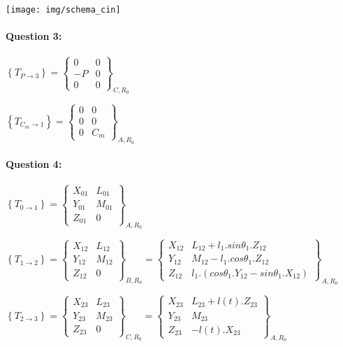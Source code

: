 \begin{center}
 \texttt{[image: img/schema\_cin]}
\end{center}

\paragraph{Question 3:}

$\left\{T_{P\rightarrow 3}\right\}=\left\{\begin{array}{cc}
0 & 0 \\
-P & 0 \\
0 & 0
\end{array}\right\}_{C,R_0}$

$\left\{T_{C_m\rightarrow 1}\right\}=\left\{\begin{array}{cc}
0 & 0 \\
0 & 0 \\
0 & C_m
\end{array}\right\}_{A,R_0}$

\paragraph{Question 4:}

$\left\{T_{0\rightarrow 1}\right\}=\left\{\begin{array}{cc}
X_{01} & L_{01} \\
Y_{01} & M_{01} \\
Z_{01} & 0
\end{array}\right\}_{A,R_0}$

$\left\{T_{1\rightarrow 2}\right\}=\left\{\begin{array}{cc}
X_{12} & L_{12} \\
Y_{12} & M_{12} \\
Z_{12} & 0
\end{array}\right\}_{B,R_0}=\left\{\begin{array}{cc}
X_{12} & L_{12}+l_1.sin\theta_1.Z_{12} \\
Y_{12} & M_{12}-l_1.cos\theta_1.Z_{12} \\
Z_{12} & l_1.(cos\theta_1.Y_{12}-sin\theta_1.X_{12})
\end{array}\right\}_{A,R_0}$

$\left\{T_{2\rightarrow 3}\right\}=\left\{\begin{array}{cc}
X_{23} & L_{23} \\
Y_{23} & M_{23} \\
Z_{23} & 0
\end{array}\right\}_{C,R_0}=\left\{\begin{array}{cc}
X_{23} & L_{23}+l(t).Z_{23} \\
Y_{23} & M_{23} \\
Z_{23} & -l(t).X_{23}
\end{array}\right\}_{A,R_0}$

